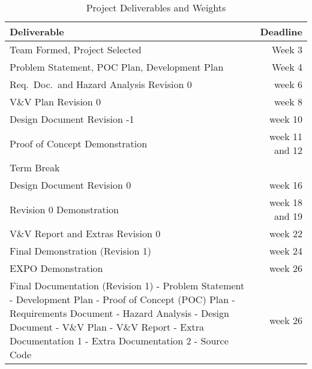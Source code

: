 \documentclass{article}
\begin{document}
\noindent \begin{longtable}{ p{9.7cm} r}
  \caption{Project Deliverables and Weights} \label{TblDeliverablesWeights}\\
   \textbf{Deliverable} & \textbf{Deadline}\\
   \midrule
   \endhead
   Team Formed, Project Selected & Week 3 \\
   
   Problem Statement, POC Plan, Development Plan &
   Week 4 \\

   Req.\ Doc.\ and Hazard Analysis Revision 0 &
   week 6\\

   V\&V Plan Revision 0 & week 8\\

   Design Document Revision -1 & week 10\\

   Proof of Concept Demonstration & week 11 and 12\\
   Term Break \\
   Design Document Revision 0 & week 16\\

   Revision 0 Demonstration & week 18 and 19\\

   V\&V Report and Extras Revision 0 & week 22\\

   Final Demonstration (Revision 1) & week 24\\

   EXPO Demonstration & week 26\\

   Final Documentation (Revision 1)\newline 
    - Problem Statement\newline
    - Development Plan\newline
    - Proof of Concept (POC) Plan\newline
    - Requirements Document\newline
    - Hazard Analysis\newline
    - Design Document\newline
    - V\&V Plan\newline
    - V\&V Report\newline
    - Extra Documentation 1\newline
    - Extra Documentation 2\newline
    - Source Code\newline & week 26\\

\end{longtable}
\end{document}
